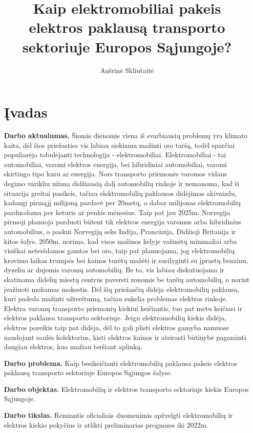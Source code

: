 \documentclass[12pt, titlepage]{article}
\title{Kaip elektromobiliai pakeis elektros paklausą transporto sektoriuje Europos Sąjungoje?}
\author{Aušrinė Skliutaitė}
\newcommand{\sectionnonum}[1]{%
    \section*{#1}%
    \addcontentsline{toc}{section}{#1}%
}
\begin{document}
\maketitle
\tableofcontents
\newpage

\sectionnonum{Įvadas}


\textbf{Darbo aktualumas.} Šiomis dienomis viena iš svarbiausių problemų yra klimato kaita, dėl šios priežasties vis labiau siekiama mažinti oro taršą, todėl sparčiai populiarėja tobulėjanti technologija - elektromobiliai. Elektromobiliai - tai automobiliai, varomi elektros energija, bei hibridiniai automobiliai, varomi skirtingo tipo kuru ar energija. Nors transporto priemonės varomos vidaus degimo varikliu užima didžiausią dalį automobilių rinkoje ir nemanoma, kad ši situacija greitai pasikeis, tačiau elektromobilių paklausos didėjimas akivaizdu, kadangi pirmąjį milijoną pardavė per 20metų, o dabar milijonas elektromobilių parduodama per keturis ar penkis mėnesius. Taip pat jau 2025m. Norvegija pirmoji planuoja parduoti būtent tik elektros energija varomus arba hibridinius automobilius, o paskui Norvegiją seks Indija, Prancūzija, Didžioji Britanija ir kitos šalys. 2050m. norima, kad visos mašinos kelyje važinėtų minimaliai arba visiškai neteršdamos gamtos bei oro, taip pat planuojama, jog elektromobilių krovimo laikas trumpės bei kainos turėtų mažėti ir susilyginti su įprastų benzinu, dyzeliu ar dujomis varomų automobilių. Be to, vis labiau diskutuojama ir skatinama didelių miestų centrus paversti zonomis be taršių automobilių, o norint įvažiuoti mokamas mokestis. Dėl šių priežasčių didėja elektromobilių paklausa, kuri padeda mažinti užterštumą, tačiau sukelia problemas elektros rinkoje. Elektra varomų transporto priemonių kiekiui keičiantis, tuo pat metu keičiasi ir elektros paklausa transporto sektoriuje. Jeigu elektromobilių kiekis didėja, elektros poreikis taip pat didėja, dėl to gali plisti elektros gamyba namuose naudojant saulės kolektorius, kisti elektros kainos ir atsirasti būtinybė pagaminti daugiau elektros, kuo mažiau teršiant aplinką.

\textbf{Darbo problema.} Kaip besikeičianti elektromobilių paklausa pakeis elektros paklausą transporto sektoriuje Europos Sąjungos šalyse.

\textbf{Darbo objektas.} Elektromobilių ir elektros transporto sektoriuje kiekis Europos Sąjungoje.

\textbf{Darbo tikslas.} Remiantis oficialiais duomenimis apžvelgti elektromobilių ir elektros kiekio pokyčius ir atlikti preliminarias prognozes iki 2022m.
\end{document}
